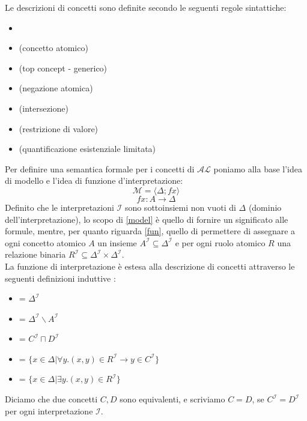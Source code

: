 Le descrizioni di concetti sono definite secondo le seguenti regole sintattiche:
\begin{itemize}
	\item[] 
	\item[] \makebox[2cm]{$\top$ \hfill} (concetto atomico)
	\item[] \makebox[2cm]{$\bot$ \hfill} (top concept - generico)
	\item[]  (negazione atomica)
	\item[]  (intersezione)
	\item[]  (restrizione di valore)
	\item[]  (quantificazione esistenziale limitata)
\end{itemize}
Per definire una semantica formale per i concetti di $\mathcal{AL}$ poniamo alla base 
l'idea di modello e l'idea di funzione d'interpretazione:
\begin{equation} \label{model}
\mathcal{M} = \langle \Delta;fx \rangle
\end{equation} 
\begin{equation} \label{fun}
fx: A \to \Delta
\end{equation}
Definito che le interpretazioni $\mathcal{I}$ sono sottoinsiemi non vuoti di $\Delta$ (dominio dell'interpretazione),
lo scopo di \ref{model} è quello di fornire un significato alle formule, mentre, 
per quanto riguarda \ref{fun}, quello di
permettere di assegnare a ogni concetto atomico $\mathit{A}$ un insieme 
$\mathit{A^{\mathcal{I}} \subseteq \Delta^{\mathcal{I}}}$ 
e per ogni ruolo atomico $\mathit{R}$ una relazione binaria 
$\mathit{R^{\mathcal{I}} \subseteq \Delta^{\mathcal{I}} \times \Delta^{\mathcal{I}}}$.\\
La funzione di interpretazione è estesa alla descrizione di concetti attraverso le seguenti definizioni induttive :
\begin{itemize}
	\item[]  = $\Delta^{\mathcal{I}}$  
	\item[]  = 
	$\Delta^{\mathcal{I}}\backslash A^{\mathcal{I}}$
	\item[]  = 
	$ C^{\mathcal{I}} \sqcap D^{\mathcal{I}} $  
	\item[]  = 
	$\{x \in \Delta| \forall y.(x,y) \in R^{\mathcal{I}} \to y \in C^{\mathcal{I}} \}$
	\item[]  = 
	$\{x \in \Delta| \exists y.(x,y) \in R^{\mathcal{I}} \}$
\end{itemize}
Diciamo che due concetti $C, D$ sono equivalenti, e scriviamo $C = D$, se
$C^{\mathcal{I}} = D^{\mathcal{I}}$ per ogni interpretazione ${\mathcal{I}}$.
